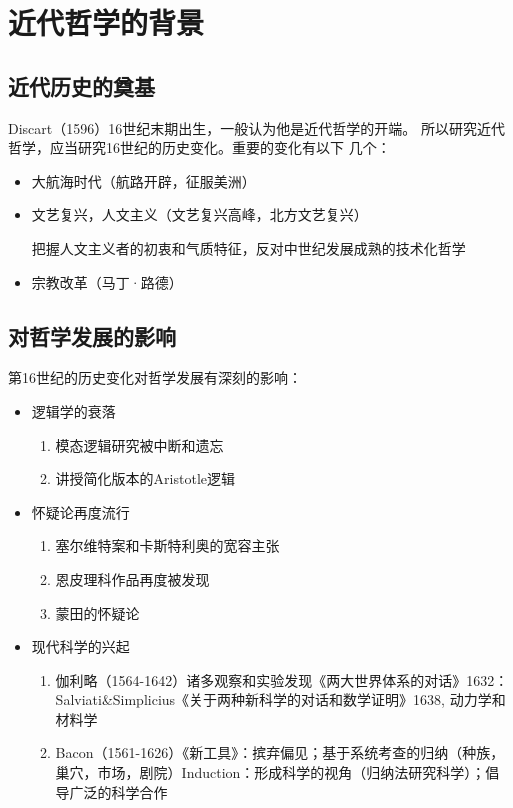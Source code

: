 \section{近代哲学的背景}

\subsection{近代历史的奠基}
Discart（1596）16世纪末期出生，一般认为他是近代哲学的开端。
所以研究近代哲学，应当研究16世纪的历史变化。重要的变化有以下
几个：

\begin{itemize}
    \item 大航海时代（航路开辟，征服美洲）
    \item 文艺复兴，人文主义（文艺复兴高峰，北方文艺复兴）
    
    把握人文主义者的初衷和气质特征，反对中世纪发展成熟的技术化哲学
    \item 宗教改革（马丁·路德）
\end{itemize}

\subsection{对哲学发展的影响}
第16世纪的历史变化对哲学发展有深刻的影响：

\begin{itemize}
    \item 逻辑学的衰落
    \begin{enumerate}
        \item 模态逻辑研究被中断和遗忘
        \item 讲授简化版本的Aristotle逻辑
    \end{enumerate}
    \item 怀疑论再度流行
    \begin{enumerate}
        \item 塞尔维特案和卡斯特利奥的宽容主张
        \item 恩皮理科作品再度被发现
        \item 蒙田的怀疑论
    \end{enumerate}
    \item 现代科学的兴起
    \begin{enumerate}
        \item 伽利略（1564-1642）诸多观察和实验发现《两大世界体系的对话》1632：Salviati\&Simplicius《关于两种新科学的对话和数学证明》1638, 动力学和材料学
        \item Bacon（1561-1626）《新工具》：摈弃偏见；基于系统考查的归纳（种族，巢穴，市场，剧院）Induction：形成科学的视角（归纳法研究科学）；倡导广泛的科学合作
    \end{enumerate}
\end{itemize}

